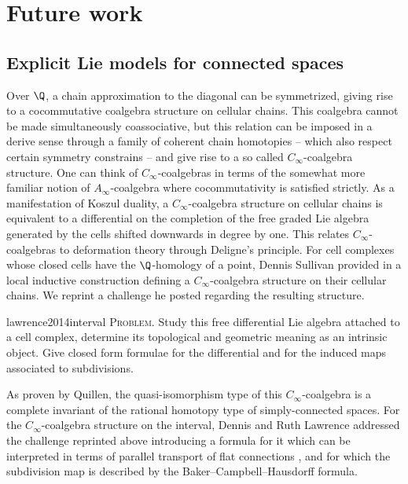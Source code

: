 
\section{Future work}

\subsection{Explicit Lie models for connected spaces}

Over $\Q$, a chain approximation to the diagonal can be symmetrized, giving rise to a cocommutative coalgebra structure on cellular chains.
This coalgebra cannot be made simultaneously coassociative, but this relation can be imposed in a derive sense through a family of coherent chain homotopies -- which also respect certain symmetry constrains -- and give rise to a so called $C_\infty$-coalgebra structure.
One can think of $C_\infty$-coalgebras in terms of the somewhat more familiar notion of $A_\infty$-coalgebra where cocommutativity is satisfied strictly.
As a manifestation of Koszul duality, a $C_\infty$-coalgebra structure on cellular chains is equivalent to a differential on the completion of the free graded Lie algebra generated by the cells shifted downwards in degree by one.
This relates $C_\infty$-coalgebras to deformation theory through Deligne's principle.
For cell complexes whose closed cells have the $\Q$-homology of a point, Dennis Sullivan provided in \cite{sullivan2007appendix} a local inductive construction defining a $C_\infty$-coalgebra structure on their cellular chains.
We reprint a challenge he posted regarding the resulting structure.
\begin{displaycquote}[p.2]{lawrence2014interval}
	\textsc{Problem}. Study this free differential Lie algebra attached to a cell complex, determine its topological and geometric meaning as an intrinsic object.
	Give closed form formulae for the differential and for the induced maps associated to subdivisions.
\end{displaycquote}
As proven by Quillen, the quasi-isomorphism type of this $C_\infty$-coalgebra is a complete invariant of the rational homotopy type of simply-connected spaces.
For the $C_\infty$-coalgebra structure on the interval, Dennis and Ruth Lawrence addressed the challenge reprinted above introducing a formula for it which can be interpreted in terms of parallel transport of flat connections \cite{lawrence2014interval}, and for which the subdivision map is described by the Baker--Campbell--Hausdorff formula.

